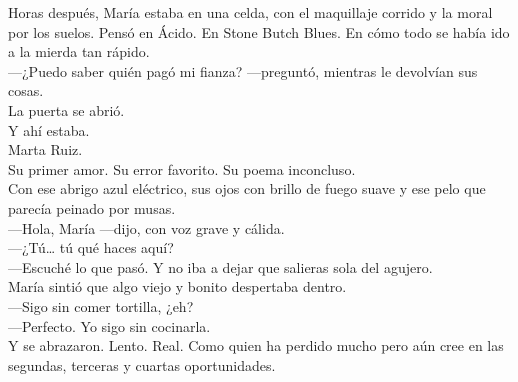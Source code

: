\saltescena

Horas después, María estaba en una celda, con el maquillaje corrido y la moral por los suelos. Pensó en Ácido. En Stone Butch Blues. En cómo todo se había ido a la mierda tan rápido.\\

—¿Puedo saber quién pagó mi fianza? —preguntó, mientras le devolvían sus cosas.\\

La puerta se abrió.\\
Y ahí estaba.\\

Marta Ruiz.\\
Su primer amor. Su error favorito. Su poema inconcluso.\\
Con ese abrigo azul eléctrico, sus ojos con brillo de fuego suave y ese pelo que parecía peinado por musas.\\

—Hola, María —dijo, con voz grave y cálida.\\
—¿Tú… tú qué haces aquí?\\
—Escuché lo que pasó. Y no iba a dejar que salieras sola del agujero.\\

María sintió que algo viejo y bonito despertaba dentro.\\
—Sigo sin comer tortilla, ¿eh?\\
—Perfecto. Yo sigo sin cocinarla.\\

Y se abrazaron. Lento. Real. Como quien ha perdido mucho pero aún cree en las segundas, terceras y cuartas oportunidades.

